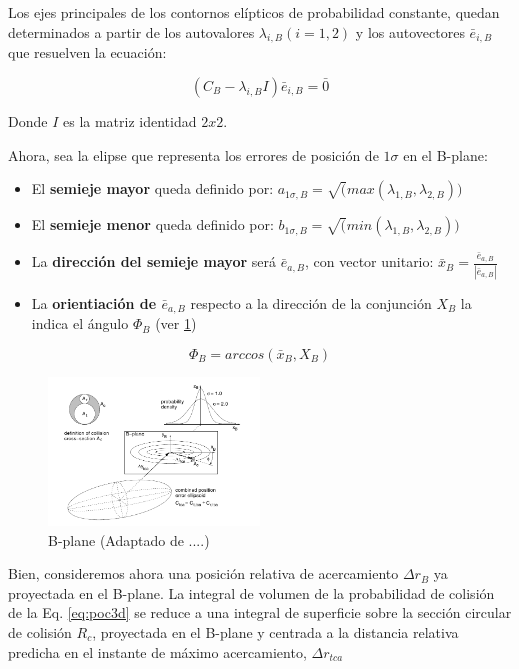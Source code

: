 Los ejes principales de los contornos el\'ipticos de probabilidad constante, quedan determinados a partir de los autovalores $\lambda_{i,B}(i=1,2)$ y los autovectores $\bar{e}_{i,B}$ que resuelven la ecuaci\'on:

\begin{equation}
(C_{B} - \lambda_{i,B} I) \bar{e}_{i,B} = \bar{0}
\end{equation}

Donde $I$ es la matriz identidad $2x2$.

Ahora, sea la elipse que representa los errores de posici\'on de $1\sigma$ en el B-plane:\\

\begin{itemize}
 \item El {\bf{semieje mayor}} queda definido por: $a_{1\sigma,B}=\sqrt(max(\lambda_{1,B},\lambda_{2,B}))$
 \item El {\bf{semieje menor}} queda definido por: $b_{1\sigma,B}=\sqrt(min(\lambda_{1,B},\lambda_{2,B}))$
 \item La {\bf{direcci\'on del semieje mayor}} ser\'a $\bar{e}_{a,B}$, con vector unitario: $ \bar{x}_{B}=\frac{\bar{e}_{a,B}}{|\bar{e}_{a,B}|}$ 
 \item La {\bf{orientiaci\'on de $\bar{e}_{a,B}$}} respecto a la direcci\'on de la conjunci\'on $X_{B}$ la indica el \'angulo $\Phi_{B}$ (ver \ref{fig:bplane})
\end{itemize}

\begin{equation}
 \Phi_{B}= arccos(\bar{x}_{B},X_{B})
\end{equation}

\begin{figure}[!h]
\centering
 \includegraphics[width=0.5\textwidth]{imagenes/akellabplane}
 \caption{ B-plane (Adaptado de ....)}
 \label{fig:bplane}
\end{figure}

Bien, consideremos ahora una posici\'on relativa de acercamiento $\Delta r_{B}$ ya proyectada en el B-plane. La integral de volumen de la probabilidad de colisi\'on de la Eq. \ref{eq:poc3d} se reduce a una integral de superficie sobre la secci\'on circular de colisi\'on $R_{c}$, proyectada en el B-plane y centrada a la distancia relativa predicha en el instante de m\'aximo acercamiento, $\Delta r_{tca}$

